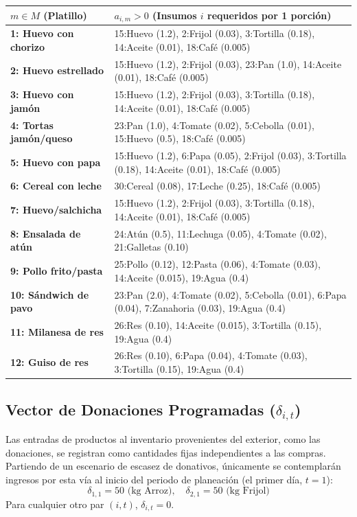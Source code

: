 \documentclass[12pt]{report}
\begin{document}
\begin{longtable}{p{4cm} p{11cm}}
\toprule
$m \in M$ (Platillo) & $a_{i,m} > 0$ (Insumos $i$ requeridos por 1 porción) \\
\midrule
\textbf{1: Huevo con chorizo} & 15:Huevo (1.2), 2:Frijol (0.03), 3:Tortilla (0.18), 14:Aceite (0.01), 18:Café (0.005) \\
\textbf{2: Huevo estrellado} & 15:Huevo (1.2), 2:Frijol (0.03), 23:Pan (1.0), 14:Aceite (0.01), 18:Café (0.005) \\
\textbf{3: Huevo con jamón} & 15:Huevo (1.2), 2:Frijol (0.03), 3:Tortilla (0.18), 14:Aceite (0.01), 18:Café (0.005) \\
\textbf{4: Tortas jamón/queso}& 23:Pan (1.0), 4:Tomate (0.02), 5:Cebolla (0.01), 15:Huevo (0.5), 18:Café (0.005) \\
\textbf{5: Huevo con papa} & 15:Huevo (1.2), 6:Papa (0.05), 2:Frijol (0.03), 3:Tortilla (0.18), 14:Aceite (0.01), 18:Café (0.005) \\
\textbf{6: Cereal con leche} & 30:Cereal (0.08), 17:Leche (0.25), 18:Café (0.005) \\
\textbf{7: Huevo/salchicha} & 15:Huevo (1.2), 2:Frijol (0.03), 3:Tortilla (0.18), 14:Aceite (0.01), 18:Café (0.005) \\
\midrule
\textbf{8: Ensalada de atún} & 24:Atún (0.5), 11:Lechuga (0.05), 4:Tomate (0.02), 21:Galletas (0.10) \\
\textbf{9: Pollo frito/pasta} & 25:Pollo (0.12), 12:Pasta (0.06), 4:Tomate (0.03), 14:Aceite (0.015), 19:Agua (0.4) \\
\textbf{10: Sándwich de pavo} & 23:Pan (2.0), 4:Tomate (0.02), 5:Cebolla (0.01), 6:Papa (0.04), 7:Zanahoria (0.03), 19:Agua (0.4) \\
\textbf{11: Milanesa de res} & 26:Res (0.10), 14:Aceite (0.015), 3:Tortilla (0.15), 19:Agua (0.4) \\
\textbf{12: Guiso de res} & 26:Res (0.10), 6:Papa (0.04), 4:Tomate (0.03), 3:Tortilla (0.15), 19:Agua (0.4) \\
\bottomrule
\end{longtable}

\subsection{Vector de Donaciones Programadas ($\delta_{i,t}$)}
Las entradas de productos al inventario provenientes del exterior, como las donaciones, se registran como cantidades fijas independientes a las compras. Partiendo de un escenario de escasez de donativos, únicamente se contemplarán ingresos por esta vía al inicio del periodo de planeación (el primer día, $t=1$):
\begin{equation}
    \delta_{1,1} = 50 \text{ (kg Arroz)}, \quad \delta_{2,1} = 50 \text{ (kg Frijol)}
\end{equation}
Para cualquier otro par $(i,t)$, $\delta_{i,t} = 0$.
\end{document}
